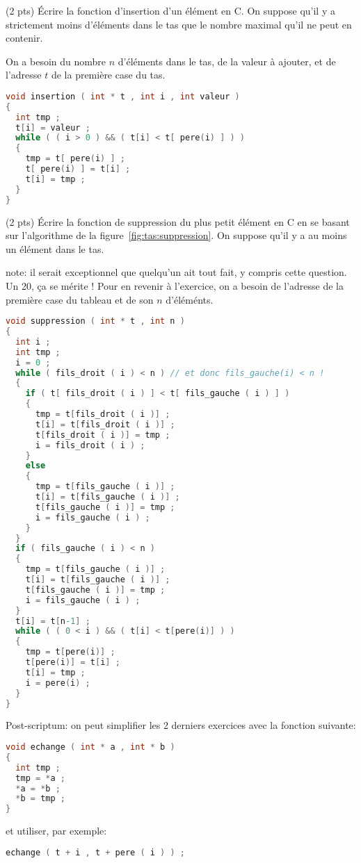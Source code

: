 \question (2 pts) {\'E}crire la fonction d'insertion d'un {\'e}l{\'e}ment en C. On suppose
qu'il y a strictement moins d'{\'e}l{\'e}ments dans le tas que le nombre
maximal qu'il ne peut en contenir.

\begin{solution}
  On a besoin du nombre \(n\) d'éléments dans le tas, de la valeur à
  ajouter, et de l'adresse \(t\) de la première case du tas.
  \begin{lstlisting}[language=C]
void insertion ( int * t , int i , int valeur )
{
  int tmp ;
  t[i] = valeur ;
  while ( ( i > 0 ) && ( t[i] < t[ pere(i) ] ) )
  {
    tmp = t[ pere(i) ] ;
    t[ pere(i) ] = t[i] ;
    t[i] = tmp ;
  }
}
  \end{lstlisting}
\end{solution}



\question (2 pts) {\'E}crire la fonction de suppression du plus petit
{\'e}l{\'e}ment en C en se basant sur l'algorithme de la
figure~\ref{fig:tas:suppression}. On suppose qu'il y a au moins un
{\'e}l{\'e}ment dans le tas.

\begin{solution}
  note: il serait exceptionnel que quelqu'un ait tout fait, y compris
  cette question. Un 20, ça se mérite ! Pour en revenir à l'exercice,
  on a besoin de l'adresse de la première case du tableau et de son
  \(n\) d'éléménts.
  \begin{lstlisting}[language=C]
void suppression ( int * t , int n )
{
  int i ;
  int tmp ;
  i = 0 ;
  while ( fils_droit ( i ) < n ) // et donc fils_gauche(i) < n !
  {
    if ( t[ fils_droit ( i ) ] < t[ fils_gauche ( i ) ] )
    {
      tmp = t[fils_droit ( i )] ;
      t[i] = t[fils_droit ( i )] ;
      t[fils_droit ( i )] = tmp ;
      i = fils_droit ( i ) ;
    }
    else
    {
      tmp = t[fils_gauche ( i )] ;
      t[i] = t[fils_gauche ( i )] ;
      t[fils_gauche ( i )] = tmp ;
      i = fils_gauche ( i ) ;
    }
  }
  if ( fils_gauche ( i ) < n )
  {
    tmp = t[fils_gauche ( i )] ;
    t[i] = t[fils_gauche ( i )] ;
    t[fils_gauche ( i )] = tmp ;
    i = fils_gauche ( i ) ;
  }
  t[i] = t[n-1] ;
  while ( ( 0 < i ) && ( t[i] < t[pere(i)] ) )
  {
    tmp = t[pere(i)] ;
    t[pere(i)] = t[i] ;
    t[i] = tmp ;
    i = pere(i) ;
  }
}    
  \end{lstlisting}

  Post-scriptum: on peut simplifier les 2 derniers exercices avec la fonction suivante:
  \begin{lstlisting}[language=C]
void echange ( int * a , int * b )
{
  int tmp ;
  tmp = *a ;
  *a = *b ;
  *b = tmp ;
}    
  \end{lstlisting}
  et utiliser, par exemple:
  \begin{lstlisting}[language=C]
    echange ( t + i , t + pere ( i ) ) ;
  \end{lstlisting}
\end{solution}




